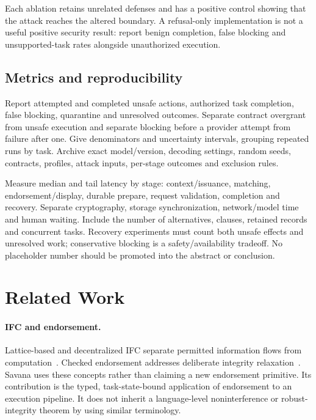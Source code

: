 \documentclass[letterpaper,twocolumn,10pt]{article}
\newcommand{\sys}{Savana}
\begin{document}
Each ablation retains unrelated defenses and has a positive control showing that
the attack reaches the altered boundary. A refusal-only implementation is not
a useful positive security result: report benign completion, false blocking and
unsupported-task rates alongside unauthorized execution.

\subsection{Metrics and reproducibility}

Report attempted and completed unsafe actions, authorized task completion,
false blocking, quarantine and unresolved outcomes. Separate contract overgrant
from unsafe execution and separate blocking before a provider attempt from
failure after one. Give denominators and uncertainty intervals, grouping repeated
runs by task. Archive exact model/version, decoding settings, random seeds,
contracts, profiles, attack inputs, per-stage outcomes and exclusion rules.

Measure median and tail latency by stage: context/issuance, matching,
endorsement/display, durable prepare, request validation, completion and recovery.
Separate cryptography, storage synchronization, network/model time and human
waiting. Include the number of alternatives, clauses, retained records and
concurrent tasks. Recovery experiments must count both unsafe effects and
unresolved work; conservative blocking is a safety/availability tradeoff.
No placeholder number should be promoted into the abstract or conclusion.

\section{Related Work}
\label{sec:related}

\paragraph{IFC and endorsement.}
Lattice-based and decentralized IFC separate permitted information flows from
computation~\cite{denning1976,myers1997}. Checked endorsement addresses deliberate
integrity relaxation~\cite{askarov2011}. \sys{} uses these concepts rather than
claiming a new endorsement primitive. Its contribution is the typed,
task-state-bound application of endorsement to an execution pipeline. It does
not inherit a language-level noninterference or robust-integrity theorem by
using similar terminology.
\end{document}
